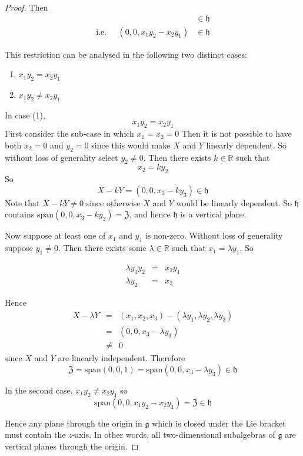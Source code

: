 \documentclass[honours]{UNSWthesis}
\newcommand{\R}{\mathbb{R}}
\newcommand{\g}{\mathfrak{g}}
\newcommand{\1}{\mathbf{e}_{1}}
\newcommand{\2}{\mathbf{e}_{3}}
\newcommand{\3}{\mathbf{e}_{3}}
\begin{document}
\begin{proof}
Then  
\begin{eqnarray*}
  [X,Y] & \in \mathfrak{h} \\
\text{i.e.}\;\;\;\;\;(0,0, x_{1}y_{2}-x_{2}y_{1}) & \in \mathfrak{h}
\end{eqnarray*}
   
This restriction can be analysed in the following two distinct cases:

\begin{enumerate}
 \item $x_{1}y_{2}=x_{2}y_{1}$
 \item $x_{1}y_{2}\neq x_{2}y_{1}$
\end{enumerate}

In case (1), 
\[
x_{1}y_{2}=x_{2}y_{1}
\]
First consider the sub-case in which $x_{1}=x_{2}=0$ Then it is not possible to have both $x_{2}=0$ and $y_{2}=0$ since this would make $X$ and $Y$ linearly dependent. So without loss of generality select $y_{2} \neq 0$. Then there exists $k \in \R$ such that 
\[
x_{2} = ky_{2}
\]
So 
\[
X-kY=(0,0,x_{3}-ky_{3}) \in \mathfrak{h}
\]
Note that $X-kY \neq 0$ since otherwise $X$ and $Y$ would be linearly dependent. So $\mathfrak{h}$ contains $\text{span}(0,0,x_{3}-ky_{3})=\mathfrak{Z}$, and hence $\mathfrak{h}$ is a vertical plane. 

Now suppose at least one of $x_{1}$ and $y_{1}$ is non-zero. Without loss of generality suppose $y_{1} \neq 0$.
Then there exists some $\lambda \in \R$ such that $x_{1} = \lambda y_{1}$. So

\begin{eqnarray*}
 \lambda y_{1}y_{2} &=& x_{2} y_{1}\\
 \lambda y_{2} &=& x_{2}
\end{eqnarray*}

Hence
\begin{eqnarray*}
 X-\lambda Y & = & (x_{1},x_{2},x_{3})-(\lambda y_{1},\lambda y_{2},\lambda y_{3}) \\
	     & = & (0,0,x_{3}-\lambda y_{3}) \\
	     & \neq & 0
\end{eqnarray*}
since $X$ and $Y$ are linearly independent. 
Therefore 
\[
\mathfrak{Z}=\text{span}(0,0,1)=\text{span}(0,0,x_{3}-\lambda y_{3}) \in \mathfrak{h}
\]

In the second case, $x_{1}y_{2}\neq x_{2}y_{1}$ so 
\[
\text{span}(0,0, x_{1}y_{2}- x_{2}y_{1})= \mathfrak{Z} \in \mathfrak{h}
\]

Hence any plane through the origin in $\g$ which is closed under the Lie bracket must contain the $z$-axis. In other words, all two-dimensional subalgebras of $\g$ are vertical planes through the origin.



\end{proof}
\end{document}
